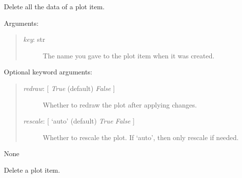 \documentclass[letterpaper,10pt,english]{sphinxmanual}
\begin{document}
\begin{fulllineitems}
\begin{fulllineitems}
\begin{quote}
\begin{description}
\end{description}
\end{quote}

\end{fulllineitems}


\begin{fulllineitems}
\label{api:mpl.Plot2D.clear_data}
Delete all the data of a plot item.

Arguments:
\begin{quote}
\begin{description}
\item[{\emph{key}: str}] \leavevmode
The name you gave to the plot item when it was created.

\end{description}
\end{quote}

Optional keyword arguments:
\begin{quote}
\begin{description}
\item[{\emph{redraw}: {[} \emph{True}  (default) \textbar{} \emph{False} {]}}] \leavevmode
Whether to redraw the plot after applying changes.

\item[{\emph{rescale}: {[} `auto' (default) \textbar{} \emph{True} \textbar{} \emph{False} {]}}] \leavevmode
Whether to rescale the plot. If `auto', then only rescale if needed.

\end{description}
\end{quote}

\end{fulllineitems}


\begin{fulllineitems}
\label{api:mpl.Plot2D.clear_events}
None

\end{fulllineitems}


\begin{fulllineitems}
\label{api:mpl.Plot2D.delete}
Delete a plot item.


\end{fulllineitems}
\end{fulllineitems}
\end{document}
